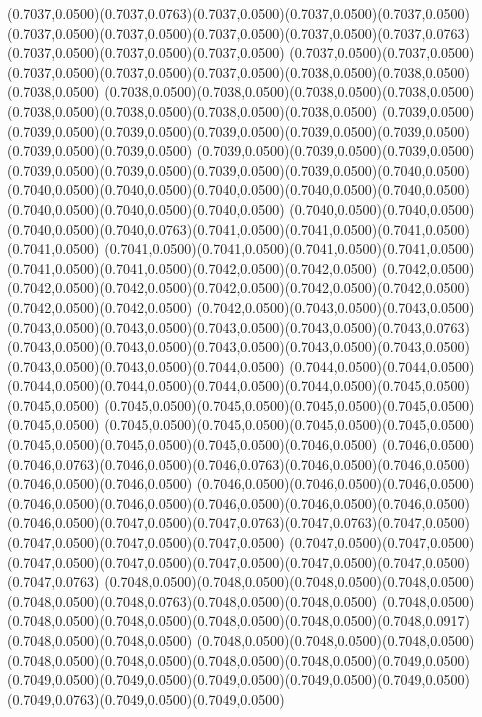 (0.7037,0.0500)(0.7037,0.0763)(0.7037,0.0500)(0.7037,0.0500)(0.7037,0.0500)
\PST@Solid(0.7037,0.0500)(0.7037,0.0500)(0.7037,0.0500)(0.7037,0.0500)(0.7037,0.0763)(0.7037,0.0500)(0.7037,0.0500)(0.7037,0.0500)
(0.7037,0.0500)(0.7037,0.0500)(0.7037,0.0500)(0.7037,0.0500)(0.7037,0.0500)(0.7038,0.0500)(0.7038,0.0500)(0.7038,0.0500)
(0.7038,0.0500)(0.7038,0.0500)(0.7038,0.0500)(0.7038,0.0500)(0.7038,0.0500)(0.7038,0.0500)(0.7038,0.0500)(0.7038,0.0500)
(0.7039,0.0500)(0.7039,0.0500)(0.7039,0.0500)(0.7039,0.0500)(0.7039,0.0500)(0.7039,0.0500)(0.7039,0.0500)(0.7039,0.0500)
(0.7039,0.0500)(0.7039,0.0500)(0.7039,0.0500)(0.7039,0.0500)(0.7039,0.0500)(0.7039,0.0500)(0.7039,0.0500)(0.7040,0.0500)
(0.7040,0.0500)(0.7040,0.0500)(0.7040,0.0500)(0.7040,0.0500)(0.7040,0.0500)(0.7040,0.0500)(0.7040,0.0500)(0.7040,0.0500)
(0.7040,0.0500)(0.7040,0.0500)(0.7040,0.0500)(0.7040,0.0763)(0.7041,0.0500)(0.7041,0.0500)(0.7041,0.0500)(0.7041,0.0500)
(0.7041,0.0500)(0.7041,0.0500)(0.7041,0.0500)(0.7041,0.0500)(0.7041,0.0500)(0.7041,0.0500)(0.7042,0.0500)(0.7042,0.0500)
(0.7042,0.0500)(0.7042,0.0500)(0.7042,0.0500)(0.7042,0.0500)(0.7042,0.0500)(0.7042,0.0500)(0.7042,0.0500)(0.7042,0.0500)
(0.7042,0.0500)(0.7043,0.0500)(0.7043,0.0500)(0.7043,0.0500)(0.7043,0.0500)(0.7043,0.0500)(0.7043,0.0500)(0.7043,0.0763)
(0.7043,0.0500)(0.7043,0.0500)(0.7043,0.0500)(0.7043,0.0500)(0.7043,0.0500)(0.7043,0.0500)(0.7043,0.0500)(0.7044,0.0500)
(0.7044,0.0500)(0.7044,0.0500)(0.7044,0.0500)(0.7044,0.0500)(0.7044,0.0500)(0.7044,0.0500)(0.7045,0.0500)(0.7045,0.0500)
(0.7045,0.0500)(0.7045,0.0500)(0.7045,0.0500)(0.7045,0.0500)(0.7045,0.0500)
\PST@Solid(0.7045,0.0500)(0.7045,0.0500)(0.7045,0.0500)(0.7045,0.0500)(0.7045,0.0500)(0.7045,0.0500)(0.7045,0.0500)(0.7046,0.0500)
(0.7046,0.0500)(0.7046,0.0763)(0.7046,0.0500)(0.7046,0.0763)(0.7046,0.0500)(0.7046,0.0500)(0.7046,0.0500)(0.7046,0.0500)
(0.7046,0.0500)(0.7046,0.0500)(0.7046,0.0500)(0.7046,0.0500)(0.7046,0.0500)(0.7046,0.0500)(0.7046,0.0500)(0.7046,0.0500)
(0.7046,0.0500)(0.7047,0.0500)(0.7047,0.0763)(0.7047,0.0763)(0.7047,0.0500)(0.7047,0.0500)(0.7047,0.0500)(0.7047,0.0500)
(0.7047,0.0500)(0.7047,0.0500)(0.7047,0.0500)(0.7047,0.0500)(0.7047,0.0500)(0.7047,0.0500)(0.7047,0.0500)(0.7047,0.0763)
(0.7048,0.0500)(0.7048,0.0500)(0.7048,0.0500)(0.7048,0.0500)(0.7048,0.0500)(0.7048,0.0763)(0.7048,0.0500)(0.7048,0.0500)
(0.7048,0.0500)(0.7048,0.0500)(0.7048,0.0500)(0.7048,0.0500)(0.7048,0.0500)(0.7048,0.0917)(0.7048,0.0500)(0.7048,0.0500)
(0.7048,0.0500)(0.7048,0.0500)(0.7048,0.0500)(0.7048,0.0500)(0.7048,0.0500)(0.7048,0.0500)(0.7048,0.0500)(0.7049,0.0500)
(0.7049,0.0500)(0.7049,0.0500)(0.7049,0.0500)(0.7049,0.0500)(0.7049,0.0500)(0.7049,0.0763)(0.7049,0.0500)(0.7049,0.0500)
